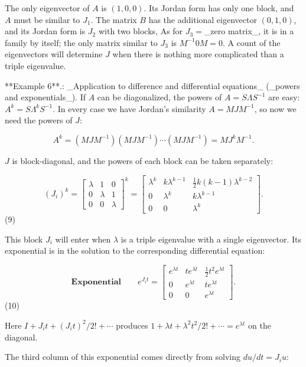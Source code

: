 The only eigenvector of \(A\) is \((1,0,0)\). Its Jordan form has only one block, and \(A\) must be similar to \(J_{1}\). The matrix \(B\) has the additional eigenvector \((0,1,0)\), and its Jordan form is \(J_{2}\) with two blocks, As for \(J_{3}=\)_zero matrix_, it is in a family by itself; the only matrix similar to \(J_{3}\) is \(M^{-1}0M=0\). A count of the eigenvectors will determine \(J\) when there is nothing more complicated than a triple eigenvalue.

**Example 6**.: _Application to difference and differential equations_ (_powers and exponentials_). If \(A\) can be diagonalized, the powers of \(A=S\Lambda S^{-1}\) are easy: \(A^{k}=S\Lambda^{k}S^{-1}\). In every case we have Jordan's similarity \(A=MJM^{-1}\), so now we need the powers of \(J\):

\[A^{k}=(MJM^{-1})(MJM^{-1})\cdots(MJM^{-1})=MJ^{k}M^{-1}.\]

\(J\) is block-diagonal, and the powers of each block can be taken separately:

\[(J_{i})^{k}=\begin{bmatrix}\lambda&1&0\\ 0&\lambda&1\\ 0&0&\lambda\end{bmatrix}^{k}=\begin{bmatrix}\lambda^{k}&k\lambda^{k-1}&\frac {1}{2}k(k-1)\lambda^{k-2}\\ 0&\lambda^{k}&k\lambda^{k-1}\\ 0&0&\lambda^{k}\end{bmatrix}.\] (9)

This block \(J_{i}\) will enter when \(\lambda\) is a triple eigenvalue with a single eigenvector. Its exponential is in the solution to the corresponding differential equation:

\[\textbf{Exponential}\qquad e^{J_{i}t}=\begin{bmatrix}e^{\lambda t}&te^{ \lambda t}&\frac{1}{2}t^{2}e^{\lambda t}\\ 0&e^{\lambda t}&te^{\lambda t}\\ 0&0&e^{\lambda t}\end{bmatrix}.\] (10)

Here \(I+J_{i}t+(J_{i}t)^{2}/2!+\cdots\) produces \(1+\lambda t+\lambda^{2}t^{2}/2!+\cdots=e^{\lambda t}\) on the diagonal.

The third column of this exponential comes directly from solving \(du/dt=J_{i}u\):

